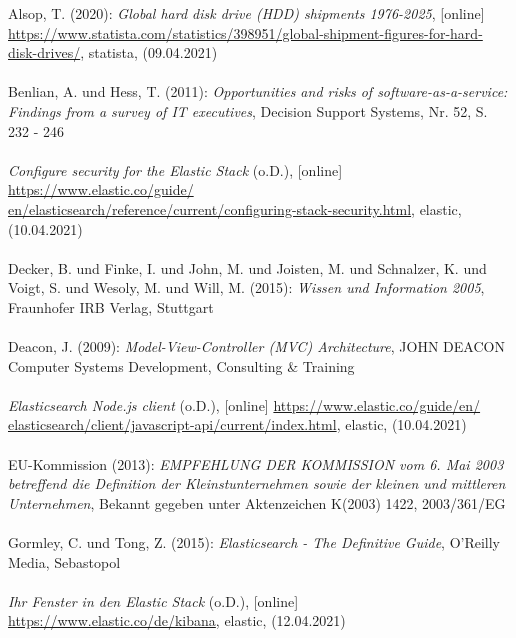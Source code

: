 \documentclass[a4paper]{scrartcl}
\begin{document}
Alsop, T. (2020): \textit{Global hard disk drive (HDD) shipments 1976-2025}, [online] \\ \href{https://www.statista.com/statistics/398951/global-shipment-figures-for-hard-disk-drives/}{https://www.statista.com/statistics/398951/global-shipment-figures-for-hard- \\ disk-drives/}, statista, (09.04.2021) \\ \\
Benlian, A. und Hess, T. (2011): \textit{Opportunities and risks of software-as-a-service: Findings from a survey of IT executives}, Decision Support Systems, Nr. 52, S. 232 - 246 \\ \\
\textit{Configure security for the Elastic Stack} (o.D.), [online] \href{https://www.elastic.co/guide/en/elasticsearch/reference/current/configuring-stack-security.html}{https://www.elastic.co/guide/ \\ en/elasticsearch/reference/current/configuring-stack-security.html}, elastic, \\ (10.04.2021) \\ \\
Decker, B. und Finke, I. und John, M. und Joisten, M. und Schnalzer, K. und Voigt, S. und Wesoly, M. und Will, M. (2015): \textit{Wissen und Information 2005}, Fraunhofer IRB Verlag, Stuttgart \\ \\
Deacon, J. (2009): \textit{Model-View-Controller (MVC) Architecture}, JOHN DEACON Computer Systems Development, Consulting \& Training \\ \\
\textit{Elasticsearch Node.js client} (o.D.), [online] \href{https://www.elastic.co/guide/en/elasticsearch/client/javascript-api/current/index.html}{https://www.elastic.co/guide/en/ \\ elasticsearch/client/javascript-api/current/index.html}, elastic, (10.04.2021) \\ \\
EU-Kommission (2013): \textit{EMPFEHLUNG DER KOMMISSION vom 6. Mai 2003 betreffend die Definition der Kleinstunternehmen sowie der kleinen und mittleren Unternehmen}, Bekannt gegeben unter Aktenzeichen K(2003) 1422, 2003/361/EG \\ \\
Gormley, C. und Tong, Z. (2015): \textit{Elasticsearch - The Definitive Guide}, O'Reilly Media, Sebastopol \\ \\
\textit{Ihr Fenster in den Elastic Stack} (o.D.), [online] \href{https://www.elastic.co/de/kibana}{https://www.elastic.co/de/kibana}, elastic, (12.04.2021) \\ \\
\end{document}
